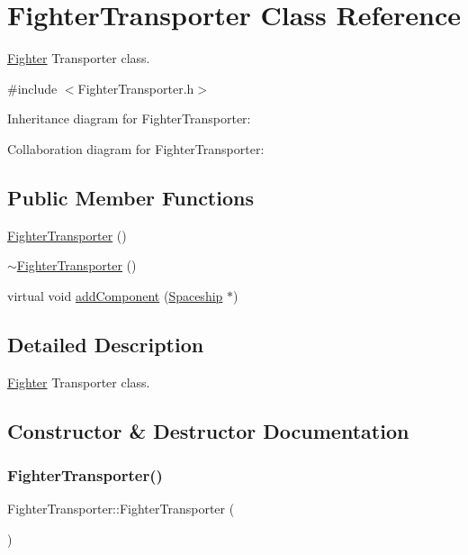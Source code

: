 \hypertarget{classFighterTransporter}{}\section{Fighter\+Transporter Class Reference}
\label{classFighterTransporter}


\hyperlink{classFighter}{Fighter} Transporter class.  




{\ttfamily \#include $<$Fighter\+Transporter.\+h$>$}



Inheritance diagram for Fighter\+Transporter\+:


Collaboration diagram for Fighter\+Transporter\+:
\subsection*{Public Member Functions}
\begin{DoxyCompactItemize}
\item 
\hyperlink{classFighterTransporter_ad8e296a192f6a5550d15ec2d3a74c4b8}{Fighter\+Transporter} ()
\item 
\hyperlink{classFighterTransporter_a65a48b07df846737c605337f69998eef}{$\sim$\+Fighter\+Transporter} ()
\item 
virtual void \hyperlink{classFighterTransporter_a2c001243993307f51abba10636c0fbb9}{add\+Component} (\hyperlink{classSpaceship}{Spaceship} $\ast$)
\end{DoxyCompactItemize}


\subsection{Detailed Description}
\hyperlink{classFighter}{Fighter} Transporter class. 

\subsection{Constructor \& Destructor Documentation}
\mbox{\label{classFighterTransporter_ad8e296a192f6a5550d15ec2d3a74c4b8}} 
\subsubsection{\texorpdfstring{Fighter\+Transporter()}{FighterTransporter()}}
{\footnotesize\ttfamily Fighter\+Transporter\+::\+Fighter\+Transporter (\begin{DoxyParamCaption}{ }\end{DoxyParamCaption})\hspace{0.3cm}{\ttfamily [inline]}}

